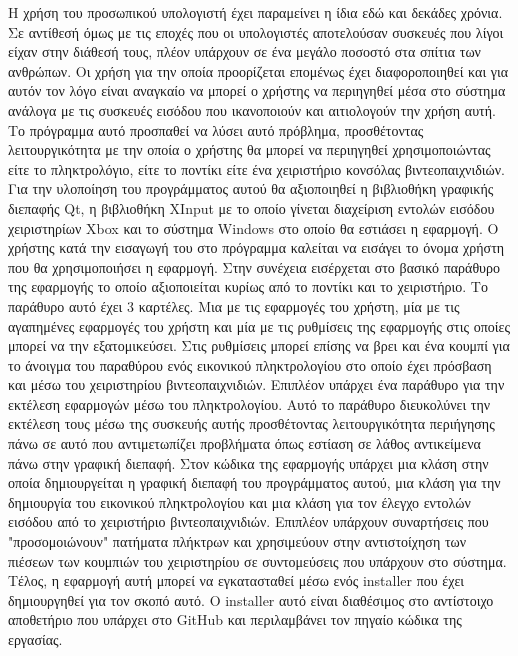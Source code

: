 






Η χρήση του προσωπικού υπολογιστή έχει παραμείνει η ίδια εδώ και δεκάδες χρόνια.
Σε αντίθεσή όμως με τις εποχές που οι υπολογιστές αποτελούσαν συσκευές που λίγοι
είχαν στην διάθεσή τους, πλέον υπάρχουν σε ένα μεγάλο ποσοστό στα σπίτια των
ανθρώπων. Οι χρήση για την οποία προορίζεται επομένως έχει διαφοροποιηθεί και
για αυτόν τον λόγο είναι αναγκαίο να μπορεί ο χρήστης να περιηγηθεί μέσα στο σύστημα
ανάλογα με τις συσκευές εισόδου που ικανοποιούν και αιτιολογούν την χρήση αυτή.
Το πρόγραμμα αυτό προσπαθεί να λύσει αυτό πρόβλημα, προσθέτοντας λειτουργικότητα
με την οποία ο χρήστης θα μπορεί να περιηγηθεί χρησιμοποιώντας είτε το πληκτρολόγιο,
είτε το ποντίκι είτε ένα χειριστήριο κονσόλας βιντεοπαιχνιδιών. Για την υλοποίηση του
προγράμματος αυτού θα αξιοποιηθεί η βιβλιοθήκη γραφικής διεπαφής Qt, η βιβλιοθήκη
XInput με το οποίο γίνεται διαχείριση εντολών εισόδου χειριστηρίων Xbox και το
σύστημα Windows στο οποίο θα εστιάσει η εφαρμογή. Ο χρήστης κατά την εισαγωγή του
στο πρόγραμμα καλείται να εισάγει το όνομα χρήστη που θα χρησιμοποιήσει η εφαρμογή.
Στην συνέχεια εισέρχεται στο βασικό παράθυρο της εφαρμογής το οποίο αξιοποιείται κυρίως
από το ποντίκι και  το χειριστήριο. Το παράθυρο αυτό έχει 3 καρτέλες. Μια με τις εφαρμογές
του χρήστη, μία με τις αγαπημένες εφαρμογές του χρήστη και μία με τις ρυθμίσεις της εφαρμογής
στις οποίες μπορεί να την εξατομικεύσει. Στις ρυθμίσεις μπορεί επίσης να βρει και ένα
κουμπί για το άνοιγμα του παραθύρου ενός εικονικού πληκτρολογίου στο οποίο έχει πρόσβαση και
μέσω του χειριστηρίου βιντεοπαιχνιδιών. Επιπλέον υπάρχει ένα παράθυρο για την εκτέλεση 
εφαρμογών μέσω του πληκτρολογίου. Αυτό το παράθυρο διευκολύνει την εκτέλεση τους μέσω της
συσκευής αυτής προσθέτοντας λειτουργικότητα περιήγησης πάνω σε αυτό που αντιμετωπίζει προβλήματα
όπως εστίαση σε λάθος αντικείμενα πάνω στην γραφική διεπαφή. Στον κώδικα της εφαρμογής υπάρχει
μια κλάση στην οποία δημιουργείται η γραφική διεπαφή του προγράμματος αυτού, μια κλάση για την
δημιουργία του εικονικού πληκτρολογίου και μια κλάση για τον έλεγχο εντολών εισόδου από το
χειριστήριο βιντεοπαιχνιδιών. Επιπλέον υπάρχουν συναρτήσεις που "προσομοιώνουν" πατήματα πλήκτρων
και χρησιμεύουν στην αντιστοίχηση των πιέσεων των κουμπιών του χειριστηρίου σε συντομεύσεις που
υπάρχουν στο σύστημα. Τέλος, η εφαρμογή αυτή μπορεί να εγκατασταθεί μέσω ενός installer που έχει
δημιουργηθεί για τον σκοπό αυτό. Ο installer αυτό είναι διαθέσιμος στο αντίστοιχο αποθετήριο που
υπάρχει στο GitHub και περιλαμβάνει τον πηγαίο κώδικα της εργασίας.